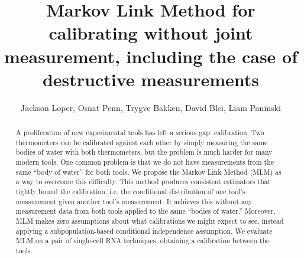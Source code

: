 



\DeclareMathOperator*{\tr}{tr}

\newcommand{\UN}[1]{\ensuremath{\left|#1\right|_\infty}}
\newcommand{\EN}[1]{\ensuremath{\left|#1\right|}}
\newcommand{\kldiv}[2]{\ensuremath{D\left(#1||#2\right)}}

\newcommand{\figgygr}[2]{\texttt{[image: \#2]}}
\newcommand{\figgy}[1]{\begin{figure}\fbox{\begin{minipage}{\textwidth}#1\end{minipage}}\end{figure}}

\usepackage{cancel}


\title{Markov Link Method for calibrating without joint measurement, including the case of destructive measurements}
\author{Jackson Loper, Osnat Penn, Trygve Bakken, David Blei, Liam Paninski}

\usepackage{amsthm}
\newtheorem*{thm}{Theorem}
\newtheorem{lem}{Lemma}
\newtheorem{conj}{Conjecture}

\theoremstyle{definition}
\newtheorem{example}{Example}
\newtheorem{definition}{Definition}


\maketitle

\begin{abstract}
A proliferation of new experimental tools has left a serious gap: calibration. Two thermometers can be calibrated against each other by simply measuring the same bodies of water with both thermometers, but the problem is much harder for many modern tools.  One common problem is that we do not have measurements from the same ``body of water'' for both tools.  We propose the Markov Link Method (MLM) as a way to overcome this difficulty.   This method produces consistent estimators that tightly bound the calibration, i.e. the conditional distribution of one tool's measurement given another tool's measurement. It achieves this without any measurement data from both tools applied to the same ``bodies of water.'' Moreover, MLM makes zero assumptions about what calibrations we might expect to see, instead applying a subpopulation-based conditional independence assumption.   We evaluate MLM on a pair of single-cell RNA techniques, obtaining a calibration between the tools.
\end{abstract}

